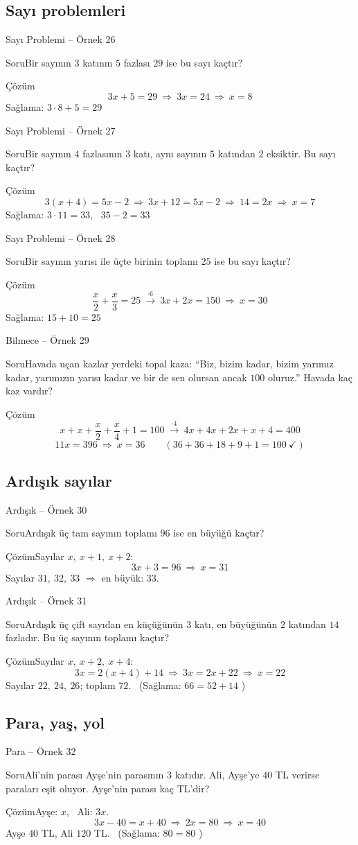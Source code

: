 \documentclass[aspectratio=169,11pt]{beamer}
\newcommand{\soru}[3]{%
\begin{frame}{#1}
  \begin{block}{Soru}\large #2\end{block}
  \pause
  \begin{exampleblock}{Çözüm}\large #3\end{exampleblock}
\end{frame}}
\begin{document}
\subsection{Sayı problemleri}
\soru{Sayı Problemi -- Örnek 26}
{Bir sayının \(3\) katının \(5\) fazlası \(29\) ise bu sayı kaçtır?}
{\[3x+5=29\ \Rightarrow\ 3x=24\ \Rightarrow\ x=8\]
Sağlama: \(3\cdot 8+5=29\) \checkmark}

\soru{Sayı Problemi -- Örnek 27}
{Bir sayının \(4\) fazlasının \(3\) katı, aynı sayının \(5\) katından \(2\) eksiktir. Bu sayı kaçtır?}
{\[3(x+4)=5x-2\ \Rightarrow\ 3x+12=5x-2\ \Rightarrow\ 14=2x\ \Rightarrow\ x=7\]
Sağlama: \(3\cdot 11=33\), \ \(35-2=33\) \checkmark}

\soru{Sayı Problemi -- Örnek 28}
{Bir sayının yarısı ile üçte birinin toplamı \(25\) ise bu sayı kaçtır?}
{\[\frac{x}{2}+\frac{x}{3}=25\ \xrightarrow{\cdot 6}\ 3x+2x=150\ \Rightarrow\ x=30\]
Sağlama: \(15+10=25\) \checkmark}

\soru{Bilmece -- Örnek 29}
{Havada uçan kazlar yerdeki topal kaza: ``Biz, bizim kadar, bizim yarımız kadar, yarımızın yarısı kadar ve bir de sen olursan ancak \(100\) oluruz.'' Havada kaç kaz vardır?}
{\[x+x+\frac{x}{2}+\frac{x}{4}+1=100\ \xrightarrow{\cdot 4}\ 4x+4x+2x+x+4=400\]
\[11x=396\ \Rightarrow\ x=36\qquad(36+36+18+9+1=100\ \checkmark)\]}

\subsection{Ardışık sayılar}
\soru{Ardışık -- Örnek 30}
{Ardışık üç tam sayının toplamı \(96\) ise en büyüğü kaçtır?}
{Sayılar \(x,\ x+1,\ x+2\):
\[3x+3=96\ \Rightarrow\ x=31\]
Sayılar \(31,\ 32,\ 33\) \(\Rightarrow\) en büyük: \(33\).}

\soru{Ardışık -- Örnek 31}
{Ardışık üç çift sayıdan en küçüğünün \(3\) katı, en büyüğünün \(2\) katından \(14\) fazladır. Bu üç sayının toplamı kaçtır?}
{Sayılar \(x,\ x+2,\ x+4\):
\[3x=2(x+4)+14\ \Rightarrow\ 3x=2x+22\ \Rightarrow\ x=22\]
Sayılar \(22,\ 24,\ 26\); toplam \(72\). \ (Sağlama: \(66=52+14\) \checkmark)}

\subsection{Para, yaş, yol}
\soru{Para -- Örnek 32}
{Ali'nin parası Ayşe'nin parasının \(3\) katıdır. Ali, Ayşe'ye \(40\) TL verirse paraları eşit oluyor. Ayşe'nin parası kaç TL'dir?}
{Ayşe: \(x\), \ Ali: \(3x\).
\[3x-40=x+40\ \Rightarrow\ 2x=80\ \Rightarrow\ x=40\]
Ayşe \(40\) TL, Ali \(120\) TL. \ (Sağlama: \(80=80\) \checkmark)}
\end{document}
